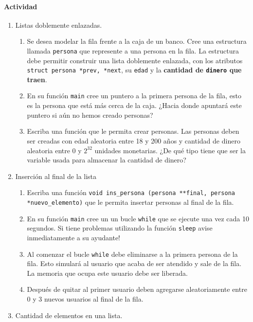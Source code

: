 \documentclass[a4paper,10pt]{article}
\begin{document}
\paragraph{Actividad}
\begin{enumerate}
  \item Listas doblemente enlazadas.
  \begin{enumerate}
    \item Se desea modelar la fila frente a la caja de un banco. Cree una estructura llamada \texttt{persona} que represente a una persona en la fila. La estructura debe permitir construir
	  una lista doblemente enlazada, con los atributos \texttt{struct persona *prev, *next}, su \texttt{edad} y la \textbf{cantidad de \texttt{dinero} que traen}.
    \item En su función \texttt{main} cree un puntero a la primera persona de la fila, esto es la persona que está más cerca de la caja. ¿Hacia donde apuntará este
	  puntero si aún no hemos creado personas?
    \item Escriba una función que le permita crear personas. Las personas deben ser creadas con edad aleatoria entre 18 y 200 años y cantidad de dinero aleatoria entre
	  0 y $2^{32}$ unidades monetarias. ¿De qué tipo tiene que ser la variable usada para almacenar la cantidad de dinero?
  \end{enumerate}
  \item Inserción al final de la lista
  \begin{enumerate}
    \item Escriba una función \texttt{void ins\_persona (persona **final, persona *nuevo\_elemento)} que le permita insertar personas al final de la fila.
    \item En su función \texttt{main} cree un un bucle \texttt{while} que se ejecute una vez cada 10 segundos. Si tiene problemas utilizando la función
	  \texttt{sleep} avise inmediatamente a su ayudante!
    \item Al comenzar el bucle \texttt{while} debe eliminarse a la primera persona de la fila. Esto simulará al usuario que acaba de ser atendido y sale de la fila.
	  La memoria que ocupa este usuario debe ser liberada.
    \item Después de quitar al primer usuario deben agregarse aleatoriamente entre 0 y 3 nuevos usuarios al final de la fila.
  \end{enumerate}
  \item Cantidad de elementos en una lista.
  \begin{enumerate}

\end{enumerate}
\end{enumerate}
\end{document}
